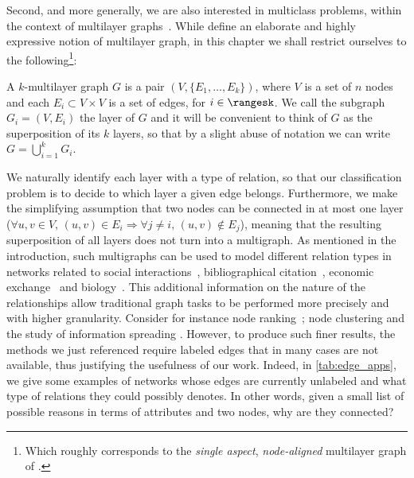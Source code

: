 Second, and more generally, we are also interested in multiclass problems, within the context of
multilayer graphs~\autocites{Kivela2014}{multiSurvey14}. While \textcite{Kivela2014} define an
elaborate and highly expressive notion of multilayer graph, in this chapter we shall restrict
ourselves to the following\footnote{Which roughly corresponds to the \emph{single aspect},
\emph{node-aligned} multilayer graph of \autocite{Kivela2014}.}:
\begin{definition}
  A $k$-multilayer graph $G$ is a pair $(V, \{E_1, \ldots, E_k \})$, where $V$ is a set of $n$ nodes
  and each $E_i \subset V\times V$ is a set of edges, for $i \in \rangesk$. We call the subgraph $G_i =
  (V, E_i)$ the \ith{} layer of $G$ and it will be convenient to think of $G$ as the superposition
  of its $k$ layers, so that by a slight abuse of notation we can write $ G = \bigcup_{i=1}^k G_i $.
\end{definition}%
We naturally identify each layer with a type of relation, so that our classification problem is to
decide to which layer a given edge belongs. Furthermore, we make the simplifying assumption that two
nodes can be connected in at most one layer (\ie $\forall u,v \in V,\, (u,v)\in E_i \Rightarrow
\forall j \neq i,\, (u,v) \notin E_j$), meaning that the resulting superposition of all layers does
not turn into a multigraph. As mentioned in the introduction, such multigraphs can be used to model
different relation types in networks related to social
interactions~\autocites{Szell2010}{RecoFlickrMulti11}, bibliographical
citation~\autocites{communityDBLPbyConf05}{articlesMultiSim11}, economic
exchange~\autocites{ports3kindofships10}{worldTradeNetwork10}{KantPeace15} and
biology~\autocites{bioLayerExp11}{EcoChile15}{Neuroscience16}.
This additional information on the nature of the relationships allow traditional graph tasks to be
performed more precisely and with higher granularity. Consider for instance node ranking~\autocite{HRRanking13};
node clustering \autocites[Section 2]{surveyAttributedClustering15}[Section 4.5.1]{Kivela2014} and
the study of information spreading \autocite{SpreadingMultiSurvey15}. However, to produce such finer
results, the methods we just referenced require labeled edges that in many cases are not available,
thus justifying the usefulness of our work. Indeed, in \autoref{tab:edge_apps}, we give some examples of
networks whose edges are currently unlabeled and what type of relations they could possibly denotes.
In other words, given a small list of possible reasons in terms of attributes and two nodes, why are
they connected?

